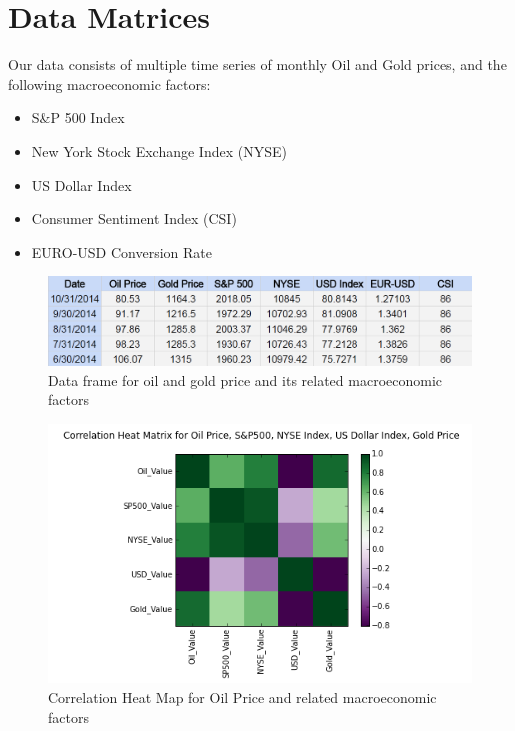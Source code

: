 \documentclass[runningheads]{llncs}
\begin{document}
\newpage
\section{Data Matrices}
Our data consists of multiple time series of monthly Oil and Gold prices, and the following macroeconomic factors:

\begin {itemize}
\item S\&P 500 Index
\item New York Stock Exchange Index (NYSE)
\item US Dollar Index
\item Consumer Sentiment Index (CSI)
\item EURO-USD Conversion Rate
\end {itemize}
 
\begin{figure}
\centering
\includegraphics[width=\textwidth]{DataMatrices.png}
\caption{Data frame for oil and gold price and its related macroeconomic factors}
\label{fig:DataMatrices.png}
\end{figure}

\begin{figure}
\centering
\includegraphics[width=\textwidth]{HeatMap_Oil_Monthly.png}
\caption{Correlation Heat Map for Oil Price and related macroeconomic factors}
\label{HeatMap_Oil_Monthly.png}
\end{figure}
\end{document}
